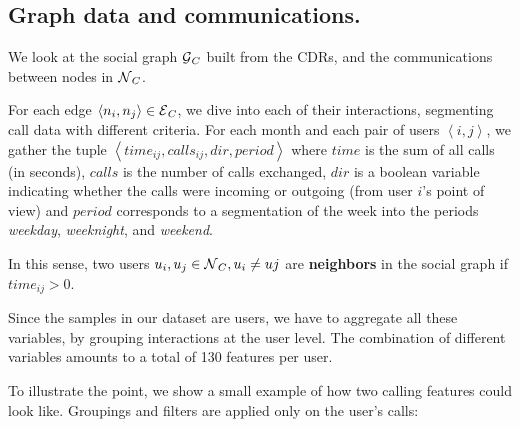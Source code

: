 \subsection{Graph data and communications.}\label{section:def_graph_data}

We look at the social graph $\operatorname{\mathcal{G}}_C$ built from the CDRs, and the communications between nodes in $\operatorname{\mathcal{N}}_C$.

For each edge $\left< n_i, n_j \right> \in \operatorname{\mathcal{E}}_C$, we dive into each of their interactions, segmenting call data with different criteria. For %
each month and each pair of users $\left< i,j \right>$, we gather the tuple $\left< time_{ij}, calls_{ij}, dir, period \right>$ where $time$ is the sum of all calls (in seconds), $calls$ is the number of calls exchanged, $dir$ is a boolean variable indicating whether the calls were incoming or outgoing (from user $i$'s point of view) and $period$ corresponds to a segmentation of the week into the periods \textit{weekday}, \textit{weeknight}, and \textit{weekend}.


In this sense, two users $u_i, u_j \in \operatorname{\mathcal{N}}_C, u_i \neq uj$ are \textbf{neighbors} in the social graph if $time_{ij} > 0$.



Since the samples in our dataset are users, we have to aggregate all these variables, by grouping interactions at the user level. The combination of different variables amounts to a total of 130 features per user.

To illustrate the point, we show a small example of how two calling features could look like. Groupings and filters are applied only on the user's calls:

